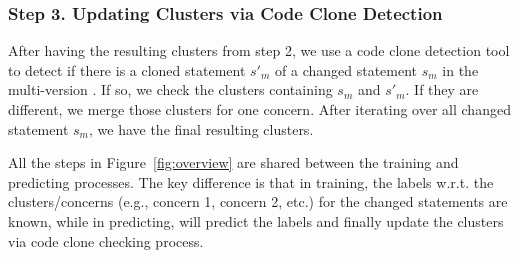
\subsubsection{{\bf Step 3. Updating Clusters via Code Clone Detection}}

After having the resulting clusters from step 2, we use a code clone
detection tool to detect if there is a cloned statement $s'_m$ of a
changed statement $s_m$ in the multi-version {\mvpdg}. If so, we check
the clusters containing $s_m$ and $s'_m$. If they are different,
we merge those clusters for one concern. After iterating over
all changed statement $s_m$, we have the final resulting clusters.


All the steps in Figure~\ref{fig:overview} are shared between the
training and predicting processes. The key difference is that in
training, the labels w.r.t. the clusters/concerns (e.g., concern 1,
concern 2, etc.) for the changed statements are known, while in
predicting, {\tool} will predict the labels and finally update the
clusters via code clone checking process.

